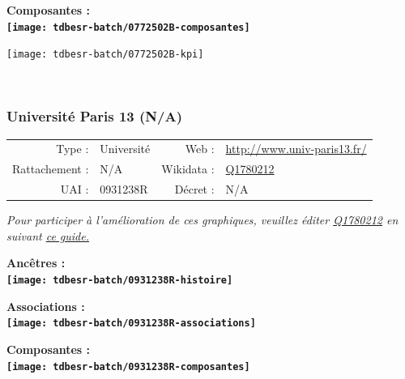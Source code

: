 \documentclass[12pt,french,]{article}
\begin{document}
\hrulefill

\begin{center} \bf Composantes : \\  
\texttt{[image: tdbesr-batch/0772502B-composantes]} \end{center}

\begin{center}\texttt{[image: tdbesr-batch/0772502B-kpi]} \end{center}\checkoddpage

\ifoddpage ~\newpage \fi   

\hypertarget{universituxe9-paris-13-na}{%
\subsubsection{Université Paris 13
(N/A)}\label{universituxe9-paris-13-na}}

\begin{tabular*}{\textwidth}{rp{5cm}rl}  
\hline  
Type : & Université & Web : &\href{http://www.univ-paris13.fr/}{http://www.univ-paris13.fr/} \\  
Rattachement : & N/A & Wikidata : & \href{https://www.wikidata.org/entity/Q1780212}{Q1780212} \\  
UAI : & 0931238R & Décret : & N/A \\  
\hline  
\end{tabular*}

\textit{\scriptsize Pour participer à l'amélioration de ces graphiques, veuillez éditer  \href{https://www.wikidata.org/entity/Q1780212}{Q1780212}  en suivant \href{https://github.com/cpesr/wikidataESR/blob/master/Rmd/wikidataESR.md}{ce guide.}}

\vspace{1cm}  
\begin{minipage}[b]{0.50\textwidth}\begin{center} \bf Ancêtres : \\  
\texttt{[image: tdbesr-batch/0931238R-histoire]} \end{center}\end{minipage}\begin{minipage}[b]{0.50\textwidth}\begin{center} \bf Associations : \\  
\texttt{[image: tdbesr-batch/0931238R-associations]} \end{center}\end{minipage}

\hrulefill

\begin{center} \bf Composantes : \\  
\texttt{[image: tdbesr-batch/0931238R-composantes]} \end{center}
\end{document}
